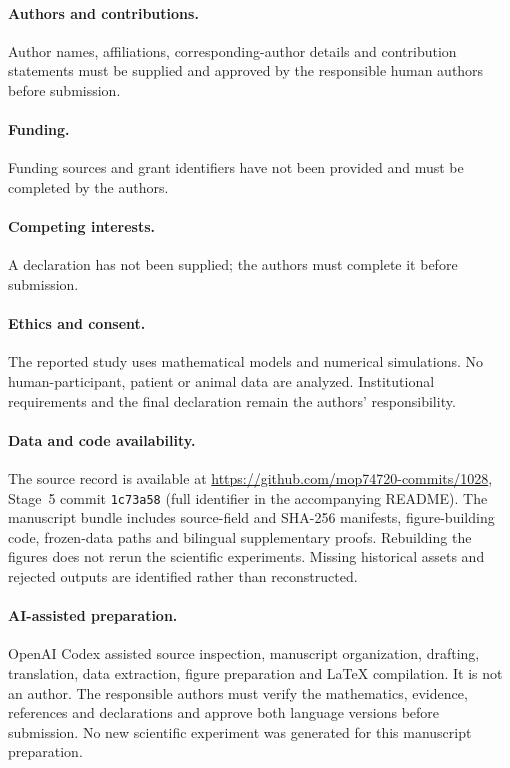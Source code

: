 \paragraph{Authors and contributions.} Author names, affiliations, corresponding-author details and contribution statements must be supplied and approved by the responsible human authors before submission.
\paragraph{Funding.} Funding sources and grant identifiers have not been provided and must be completed by the authors.
\paragraph{Competing interests.} A declaration has not been supplied; the authors must complete it before submission.
\paragraph{Ethics and consent.} The reported study uses mathematical models and numerical simulations. No human-participant, patient or animal data are analyzed. Institutional requirements and the final declaration remain the authors' responsibility.
\paragraph{Data and code availability.} The source record is available at \url{https://github.com/mop74720-commits/1028}, Stage~5 commit \texttt{1c73a58} (full identifier in the accompanying README). The manuscript bundle includes source-field and SHA-256 manifests, figure-building code, frozen-data paths and bilingual supplementary proofs. Rebuilding the figures does not rerun the scientific experiments. Missing historical assets and rejected outputs are identified rather than reconstructed.
\paragraph{AI-assisted preparation.} OpenAI Codex assisted source inspection, manuscript organization, drafting, translation, data extraction, figure preparation and LaTeX compilation. It is not an author. The responsible authors must verify the mathematics, evidence, references and declarations and approve both language versions before submission. No new scientific experiment was generated for this manuscript preparation.
